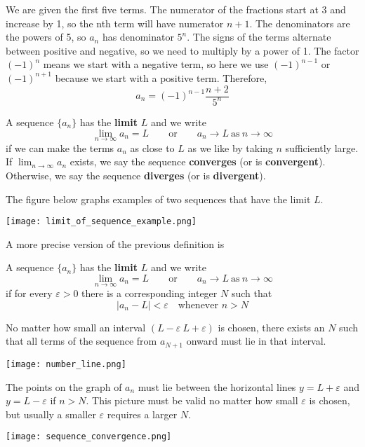   \begin{solution}
    We are given the first five terms. The numerator of the fractions start at 3 and increase by 1, so the nth term will have numerator $n+1$. The denominators are the powers of 5, so $a_n$ has denominator $5^n$. The signs of the terms alternate between positive and negative, so we need to multiply by a power of 1. The factor $(-1)^n$ means we start with a negative term, so here we use $(-1)^{n-1}$ or $(-1)^{n+1}$ because we start with a positive term. Therefore,
    $$a_n=(-1)^{n-1}\frac{n+2}{5^n}$$
  \end{solution}
  \begin{definition}
    A sequence $\{a_n\}$ has the \textbf{limit} $L$ and we write
    $$\lim_{n\to\infty} a_n = L \qquad \text{or} \qquad a_n \to L\ \text{as}\ n \to \infty$$
    if we can make the terms $a_n$ as close to $L$ as we like by taking $n$ sufficiently large. If $\lim_{n \to \infty} a_n$ exists, we say the sequence \textbf{converges} (or is \textbf{convergent}). Otherwise, we say the sequence \textbf{diverges} (or is \textbf{divergent}).
  \end{definition}
  The figure below graphs examples of two sequences that have the limit $L$.
  \begin{center}
    \texttt{[image: limit\_of\_sequence\_example.png]}
  \end{center}
  A more precise version of the previous definition is
  \begin{definition}
    A sequence $\{a_n\}$ has the \textbf{limit} $L$ and we write
    $$\lim_{n\to\infty} a_n = L \qquad \text{or} \qquad a_n \to L\ \text{as}\ n \to \infty$$
    if for every $\varepsilon > 0$ there is a corresponding integer $N$ such that
    $$|a_n - L| < \varepsilon \quad \text{whenever } n > N$$
  \end{definition}
  No matter how small an interval $(L-\varepsilon\ L+\varepsilon)$ is chosen, there exists an $N$ such that all terms of the sequence from $a_{N+1}$ onward must lie in that interval.
  \begin{center}
    \texttt{[image: number\_line.png]}
  \end{center}
  The points on the graph of $a_n$ must lie between the horizontal lines $y=L+\varepsilon$ and $y=L-\varepsilon$ if $n > N$. This picture must be valid no matter how small $\varepsilon$ is chosen, but usually a smaller $\varepsilon$ requires a larger $N$.
  \begin{center}
    \texttt{[image: sequence\_convergence.png]}
  \end{center}
